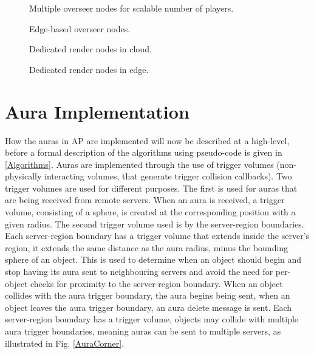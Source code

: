 \begin{figure}
	\centering
	\scalebox{1.25}{}
	\caption{Multiple overseer nodes for scalable number of players.}
\end{figure}

\begin{figure}
	\centering
	\scalebox{1.25}{}
	\caption{Edge-based overseer nodes.}
\end{figure}

\begin{figure}
	\centering
	\scalebox{1.25}{}
	\caption{Dedicated render nodes in cloud.}
\end{figure}

\begin{figure}
	\centering
	\scalebox{1.25}{}
	\caption{Dedicated render nodes in edge.}
\end{figure}

\section{Aura Implementation}
How the auras in AP are implemented will now be described at a high-level, before a formal description of the algorithms using pseudo-code is given in \ref{Algorithms}.
Auras are implemented through the use of trigger volumes (non-physically interacting volumes, that generate trigger collision callbacks). Two trigger volumes are used for different purposes. 
The first is used for auras that are being received from remote servers. When an aura is received, a trigger volume, consisting of a sphere, is created at the corresponding position with a given radius. The second trigger volume used is by the server-region boundaries. Each server-region boundary has a trigger volume that extends inside the server's region, it extends the same distance as the aura radius, minus the bounding sphere of an object. This is used to determine when an object should begin and stop having its aura sent to neighbouring servers and avoid the need for per-object checks for proximity to the server-region boundary. When an object collides with the aura trigger boundary, the aura begins being sent, when an object leaves the aura trigger boundary, an aura delete message is sent.
Each server-region boundary has a trigger volume, objects may collide with multiple aura trigger boundaries, meaning auras can be sent to multiple servers, as illustrated in Fig. \ref{AuraCorner}.

